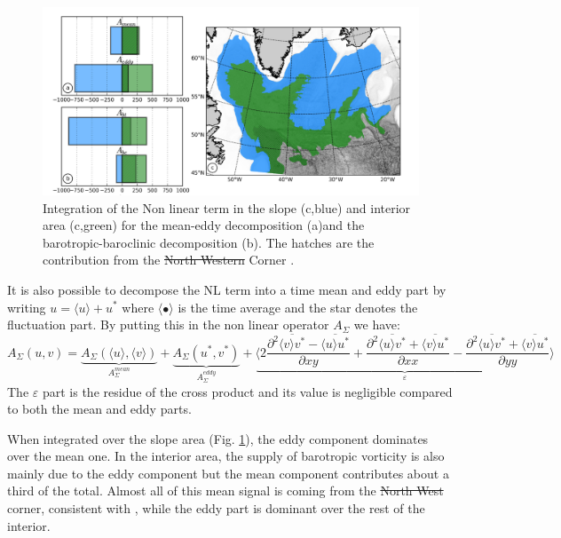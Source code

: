 \documentclass[os, manuscript]{copernicus}
\providecommand{\DIFadd}[1]{{\protect\color{blue}\uwave{#1}}} %
\providecommand{\DIFdel}[1]{{\protect\color{red}\sout{#1}}}                      %
\providecommand{\DIFaddbegin}{} %
\providecommand{\DIFaddend}{} %
\providecommand{\DIFdelbegin}{} %
\providecommand{\DIFdelend}{} %
\providecommand{\DIFaddFL}[1]{\DIFadd{#1}} %
\providecommand{\DIFdelFL}[1]{\DIFdel{#1}} %
\providecommand{\DIFaddbeginFL}{} %
\providecommand{\DIFaddendFL}{} %
\providecommand{\DIFdelbeginFL}{} %
\providecommand{\DIFdelendFL}{} %
\begin{document}
\begin{figure}[t]
\includegraphics[width=14cm]{../fig_os/f13.pdf}
\caption{Integration of the Non linear term in the slope (c,blue) and interior area (c,green) for the mean-eddy decomposition (a)and the barotropic-baroclinic decomposition (b). The hatches are the contribution from the \DIFdelbeginFL \DIFdelFL{North Western }\DIFdelendFL \DIFaddbeginFL \DIFaddFL{Northwestern }\DIFaddendFL Corner .}
\label{f13}
\end{figure} 

It is also possible to decompose the NL term into a time mean and eddy part by writing $u = \langle u \rangle + u^*$ where $\langle \bullet\rangle$ is the time average and the star denotes the fluctuation part. By putting this in the non linear operator $A_{\Sigma}$ we have:
\begin{equation}
A_{\Sigma}(u,v)=\underbrace{A_{\Sigma}(\langle u \rangle, \langle v \rangle)}_{A_{\Sigma}^{mean}} + \underbrace{A_{\Sigma}(u^*,v^*)}_{A_{\Sigma}^{eddy}} +\underbrace{\langle  2\frac{\partial ^2 \overline{\langle v \rangle v^*} -\overline{\langle u \rangle u^*}}{\partial xy} +\frac{\partial ^2 \overline{\langle u \rangle v^*} + \overline{\langle v \rangle u^*}}{\partial xx} - \frac{\partial ^2 \overline{\langle u \rangle v^*} +\overline{ \langle v \rangle u^*}}{\partial yy}\rangle}_{\varepsilon}
\end{equation}
The $\varepsilon$ part is the residue of the cross product and its value is negligible compared to both the mean and eddy parts. 

When integrated over the slope area (Fig. \ref{f13}), the eddy component dominates over the mean one. In the interior area, the supply of barotropic vorticity is also mainly due to the eddy component but the mean component contributes about a third of the total. Almost all of this mean signal is coming from the \DIFdelbegin \DIFdel{North West }\DIFdelend \DIFaddbegin \DIFadd{Northwest }\DIFaddend corner, consistent with \citet{wang2017}, while the eddy part is dominant over the rest of the interior. 
\end{document}
